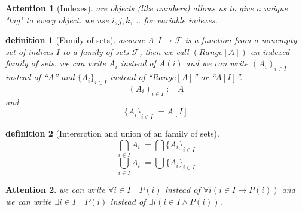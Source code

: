 \documentclass[10pt,a4paper]{book}
\newtheorem{definition}{definition}[section]
\newtheorem{Attention}{Attention}[section]
\begin{document}
\begin{Attention} [Indexes]
     are objects (like numbers) allows us to give a unique "tag" to every object.
    we use $i,j,k,...$ for variable indexes.

\end{Attention}

\begin{definition} [Family of sets]
      assume $A: I \to  \mathcal{F}$ is a function from a nonempty set of
    indices $I$ to a family of sets $\mathcal{F}$, then we call $(Range[A])$ an indexed family of sets.
    we can write $A_i$ instead of $A(i)$ and we can write $( A_i )_{i \in I}$ instead
    of ``$A$''  and $\{ A_i \}_{i \in I}$ instead
    of ``$Range[A]$'' or ``$A[I]$''.
    \[ ( A_i )_{i \in I} :=  A \]
    and
    \[ \{ A_i \}_{i \in I} :=  A[I] \]
\end{definition}

\begin{definition} [Intersrction and union of an family of sets]
    
    \[  \bigcap_{i \in I} A_i := \bigcap \{ A_i \}_{i \in I}  \]
    \[ \bigcup_{i \in I} A_i := \bigcup \{ A_i \}_{i \in I}  \]
\end{definition}

\begin{Attention}
    \textbf{}we can write $\forall i \in I  \quad P(i)$ instead of
    $\forall i (i\in I \rightarrow  P(i) )$ and we can write $\exists i \in I  \quad P(i)$
    instead of $\exists i (i\in I  \land P(i))$.

\end{Attention}
\end{document}
